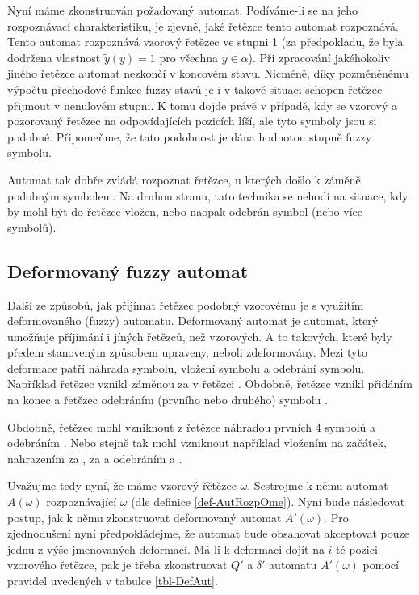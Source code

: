 \documentclass[a4paper,10pt]{article}
\begin{document}
Nyní máme zkonstruován požadovaný automat. Podíváme-li se na jeho rozpoznávací charakteristiku, je zjevné, jaké řetězce tento automat rozpoznává. Tento automat rozpoznává vzorový řetězec ve stupni 1 (za předpokladu, že byla dodržena vlastnost $\widetilde{y}(y) = 1$ pro všechna $y \in \alpha$). Při zpracování jakéhokoliv jiného řetězce automat nezkončí v koncovém stavu. Nicméně, díky pozměněnému výpočtu přechodové funkce fuzzy stavů je i v takové situaci schopen řetězec přijmout v nenulovém stupni. K tomu dojde právě v případě, kdy se vzorový a pozorovaný řetězec na odpovídajících pozicích líší, ale tyto symboly jsou si podobné. Připomeňme, že tato podobnost je dána hodnotou stupně fuzzy symbolu.

Automat tak dobře zvládá rozpoznat řetězce, u kterých došlo k záměně podobným symbolem. Na druhou stranu, tato technika se nehodí na situace, kdy by mohl být do řetězce vložen, nebo naopak odebrán symbol (nebo více symbolů). 

\subsection{Deformovaný fuzzy automat}
Další ze způsobů, jak přijímat řetězec podobný vzorovému je s využitím deformovaného (fuzzy) automatu. Deformovaný automat je automat, který umožňuje příjímání i jíných řetězců, než vzorových. A to takových, které byly předem stanoveným způsobem upraveny, neboli zdeformovány. Mezi tyto deformace patří náhrada symbolu, vložení symbolu a odebrání symbolu. Například řetězec  vznikl záměnou  za  v řetězci . Obdobně, řetězec  vznikl přidáním  na konec a řetězec  odebráním (prvního nebo druhého) symbolu .

Obdobně, řetězec  mohl vzniknout z řetězce  náhradou prvních 4 symbolů a odebráním . Nebo stejně tak mohl vzniknout například vložením  na začátek, nahrazením  za ,  za  a odebráním  a .

Uvažujme tedy nyní, že máme vzorový řětězec $\omega$. Sestrojme k němu automat $A(\omega)$ rozpoznávající $\omega$ (dle definice \ref{def-AutRozpOme}). Nyní bude následovat postup, jak k němu zkonstruovat deformovaný automat $A'(\omega)$. Pro zjednodušení nyní předpokládejme, že automat bude obsahovat akceptovat pouze jednu z výše jmenovaných deformací. Má-li k deformaci dojít na $i$-té pozici vzorového řetězce, pak je třeba zkonstruovat $Q'$ a $\delta'$ automatu $A'(\omega)$ pomocí pravidel uvedených v tabulce \ref{tbl-DefAut}.
\end{document}
